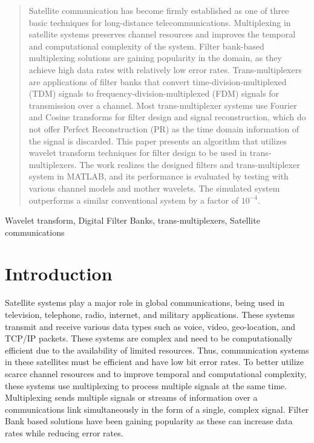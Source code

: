 \documentclass[conference]{IEEEtran}
\begin{document}
\maketitle

\begin{abstract}
Satellite communication has become firmly established as one of three basic techniques for long-distance telecommunications. Multiplexing in satellite systems preserves channel resources and improves the temporal and computational complexity of the system. Filter bank-based multiplexing solutions are gaining popularity in the domain, as they achieve high data rates with relatively low error rates. Trans-multiplexers are applications of filter banks that convert time-division-multiplexed (TDM) signals to frequency-division-multiplexed (FDM) signals for transmission over a channel. Most trans-multiplexer systems use Fourier and Cosine transforms for filter design and signal reconstruction, which do not offer Perfect Reconstruction (PR) as the time domain information of the signal is discarded. This paper presents an algorithm that utilizes wavelet transform techniques for filter design to be used in trans-multiplexers. The work realizes the designed filters and trans-multiplexer system in MATLAB, and its performance is evaluated by testing with various channel models and mother wavelets. The simulated system outperforms a similar conventional system by a factor of $10^{-4}$.
\end{abstract}

\begin{IEEEkeywords}
Wavelet transform, Digital Filter Banks, trans-multiplexers, Satellite communications
\end{IEEEkeywords}

\section{Introduction}
Satellite systems play a major role in global communications, being used in television, telephone, radio, internet, and military applications. These systems transmit and receive various data types such as voice, video, geo-location, and TCP/IP packets. These systems are complex and need to be computationally efficient due to the availability of limited resources. Thus, communication systems in these satellites must be efficient and have low bit error rates. To better utilize scarce channel resources and to improve temporal and computational complexity, these systems use multiplexing to process multiple signals at the same time. Multiplexing sends multiple signals or streams of information over a communications link simultaneously in the form of a single, complex signal. Filter Bank based solutions have been gaining popularity as these can increase data rates while reducing error rates. \par
\end{document}
